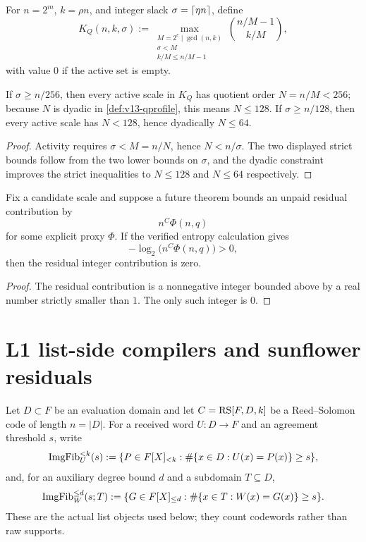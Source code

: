 \begin{definition}\label{def:v13-qprofile}
For $n=2^m$, $k=\rho n$, and integer slack $\sigma=\left\lceil \eta n\right\rceil$, define
\[
K_Q(n,k,\sigma):=
\max_{\substack{M=2^e\mid\gcd(n,k)\\ \sigma<M\\ k/M\le n/M-1}}
\binom{n/M-1}{k/M},
\]
with value $0$ if the active set is empty.
\end{definition}

\begin{proposition}\label{prop:v13-qprofile}
If $\sigma\ge n/256$, then every active scale in $K_Q$ has quotient order $N=n/M<256$; because $N$ is dyadic in \cref{def:v13-qprofile}, this means $N\le128$.  If $\sigma\ge n/128$, then every active scale has $N<128$, hence dyadically $N\le64$.
\end{proposition}

\begin{proof}
Activity requires $\sigma<M=n/N$, hence $N<n/\sigma$.  The two displayed strict bounds follow from the two lower bounds on $\sigma$, and the dyadic constraint improves the strict inequalities to $N\le128$ and $N\le64$ respectively.
\end{proof}

\begin{proposition}\label{prop:v13-integrality}
Fix a candidate scale and suppose a future theorem bounds an unpaid residual contribution by
\[
        n^C\Phi(n,q)
\]
for some explicit proxy $\Phi$.  If the verified entropy calculation gives
\[
        -\log_2\bigl(n^C\Phi(n,q)\bigr)>0,
\]
then the residual integer contribution is zero.
\end{proposition}

\begin{proof}
The residual contribution is a nonnegative integer bounded above by a real number strictly smaller than $1$.  The only such integer is $0$.
\end{proof}

\section{L1 list-side compilers and sunflower residuals}\label{sec:v13-l1}

Let $D\subset F$ be an evaluation domain and let $C=\mathrm{RS}[F,D,k]$ be a Reed--Solomon code of length $n=|D|$.  For a received word $U:D\to F$ and an agreement threshold $s$, write
\[
        \operatorname{ImgFib}_U^{<k}(s):=
        \{P\in F[X]_{<k}: \#\{x\in D:U(x)=P(x)\}\ge s\},
\]
and, for an auxiliary degree bound $d$ and a subdomain $T\subseteq D$,
\[
        \operatorname{ImgFib}_W^{\le d}(s;T):=
        \{G\in F[X]_{\le d}: \#\{x\in T:W(x)=G(x)\}\ge s\}.
\]
These are the actual list objects used below; they count codewords rather than raw supports.

